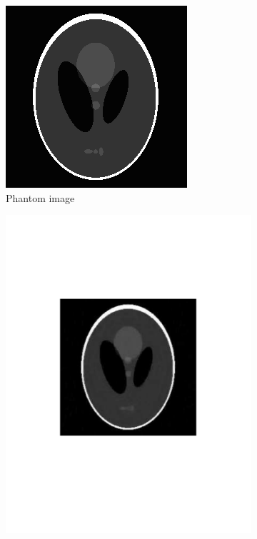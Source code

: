 \begin{figure}[!htb] \centering
    \begin{subfigure}{0.45\linewidth}
    	\centering
        \includegraphics[width=0.9\linewidth]{./figs/phantom_img}
         \caption{Phantom image}\label{fig:pds_a}		
    \end{subfigure} %
    \quad
    \begin{subfigure}{0.45\linewidth}
    	\centering
        \includegraphics[width=0.9\linewidth]{./figs/phantom_pds_img}

\end{subfigure}
\end{figure}
